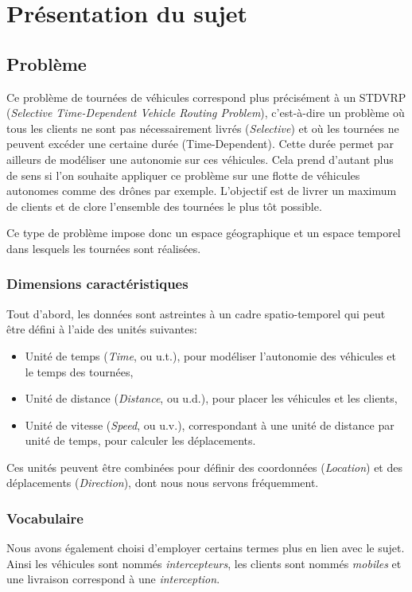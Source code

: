 \chapter{Présentation du sujet}
	\section{Problème}
		Ce problème de tournées de véhicules correspond plus précisément à un STDVRP (\emph{Selective Time-Dependent Vehicle Routing Problem}), c'est-à-dire un problème où tous les clients ne sont pas nécessairement livrés (\emph{Selective}) et où les tournées ne peuvent excéder une certaine durée (Time-Dependent). Cette durée permet par ailleurs de modéliser une autonomie sur ces véhicules. Cela prend d'autant plus de sens si l'on souhaite appliquer ce problème sur une flotte de véhicules autonomes comme des drônes par exemple. L'objectif est de livrer un maximum de clients et de clore l'ensemble des tournées le plus tôt possible.

		Ce type de problème impose donc un espace géographique et un espace temporel dans lesquels les tournées sont réalisées.

		\subsection{Dimensions caractéristiques}
			Tout d'abord, les données sont astreintes à un cadre spatio-temporel qui peut être défini à l'aide des unités suivantes:
			\begin{itemize}
				\item Unité de temps (\emph{Time}, ou u.t.), pour modéliser l'autonomie des véhicules et le temps des tournées,
				\item Unité de distance (\emph{Distance}, ou u.d.), pour placer les véhicules et les clients,
				\item Unité de vitesse (\emph{Speed}, ou u.v.), correspondant à une unité de distance par unité de temps, pour calculer les déplacements.
			\end{itemize}
			Ces unités peuvent être combinées pour définir des coordonnées (\emph{Location}) et des déplacements (\emph{Direction}), dont nous nous servons fréquemment.

		\subsection{Vocabulaire}
			Nous avons également choisi d'employer certains termes plus en lien avec le sujet. Ainsi les véhicules sont nommés \emph{intercepteurs}, les clients sont nommés \emph{mobiles} et une livraison correspond à une \emph{interception}.


